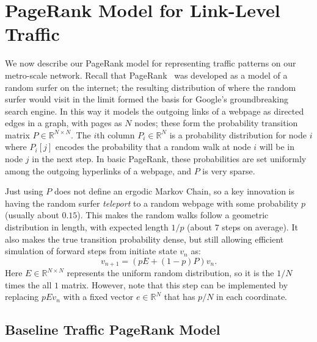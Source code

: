 \documentclass[sigconf, review]{acmart}
\newcommand{\R}{\mathbb{R}}
\begin{document}
\section{PageRank Model for Link-Level Traffic}
\label{sec:pagerank}

We now describe our PageRank model for representing traffic patterns on our metro-scale network.  
Recall that PageRank~\cite{page1999pagerank,gleich2015pagerank} was developed as a model of a random surfer on the internet; the resulting distribution of where the random surfer would visit in the limit formed the basis for Google's groundbreaking search engine.  In this way it models the outgoing links of a webpage as directed edges in a graph, with pages as $N$ nodes; these form the probability transition matrix $P \in \R^{N \times N}$.  The $i$th column $P_i \in \R^N$ is a probability distribution for node $i$ where $P_i[j]$ encodes the probability that a random walk at node $i$ will be in node $j$ in the next step. In basic PageRank, these probabilities are set uniformly among the outgoing hyperlinks of a webpage, and $P$ is very sparse.  

Just using $P$ does not define an ergodic Markov Chain, so a key innovation is having the random surfer \emph{teleport} to a random webpage with some probability $p$ (usually about $0.15$).  This makes the random walks follow a geometric distribution in length, with expected length $1/p$ (about $7$ steps on average).  It also makes the true transition probability dense, but still allowing efficient simulation of forward steps from initiate state $v_n$ as:
\begin{equation}
\label{eq:base-PR}
 v_{n+1} = (p E + (1 - p) P) v_n.
\end{equation}
Here $E \in \R^{N \times N}$ represents the uniform random distribution, so it is the $1/N$ times the all $1$ matrix.  However, note that this step can be implemented by replacing $p E v_n$ with a fixed vector $e \in \R^N$ that has $p/N$ in each coordinate.  

\subsection{Baseline Traffic PageRank Model}
\label{sec:baseline-pagerank}
\end{document}
